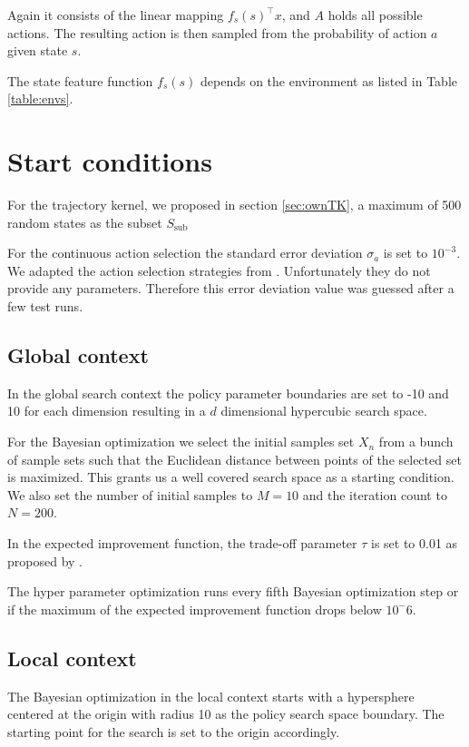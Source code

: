 Again it consists of the linear mapping $f_s(s)^\top x$, and $A$ holds all possible actions. The resulting action is then sampled from the probability of action $a$ given state $s$.

The state feature function $f_s(s)$ depends on the environment as listed in Table \ref{table:envs}.

\section{Start conditions}

For the trajectory kernel, we proposed in section \ref{sec:ownTK}, a maximum of 500 random states as the subset $S_{\text{sub}}$

For the continuous action selection the standard error deviation $\sigma_a$ is set to $10^{-3}$. We adapted the action selection strategies from \cite{wilson2014using}. Unfortunately they do not provide any parameters. Therefore this error deviation value was guessed after a few test runs.

\subsection{Global context}

In the global search context the policy parameter boundaries are set to -10 and 10 for each dimension resulting in a $d$ dimensional hypercubic search space.

For the Bayesian optimization we select the initial samples set $X_n$ from a bunch of sample sets such that the Euclidean distance between points of the selected set is maximized. This grants us a well covered search space as a starting condition. We also set the number of initial samples to $M = 10$ and the iteration count to $N = 200$.

In the expected improvement function, the trade-off parameter $\tau$ is set to 0.01 as proposed by \cite{brochu2010tutorial}.

The hyper parameter optimization runs every fifth Bayesian optimization step or if the maximum of the expected improvement function drops below $10^-6$.

\subsection{Local context}
The Bayesian optimization in the local context starts with a hypersphere centered at the origin with radius 10 as the policy search space boundary. The starting point for the search is set to the origin accordingly.

